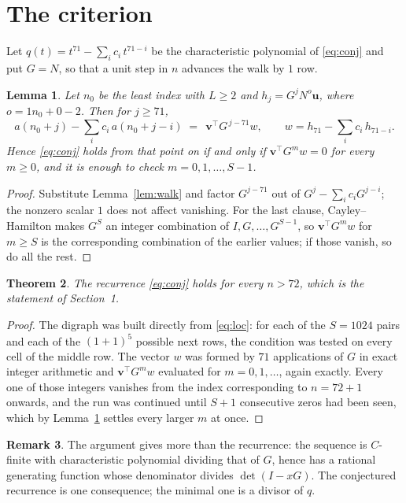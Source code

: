 \documentclass[11pt,a4paper]{article}
\theoremstyle{plain}
\newtheorem{theorem}{Theorem}
\newtheorem{lemma}[theorem]{Lemma}
\theoremstyle{definition}
\newtheorem{remark}[theorem]{Remark}
\begin{document}
\section{The criterion}

Let $q(t)=t^{71}-\sum_i c_i\,t^{71-i}$ be the characteristic polynomial of
\eqref{eq:conj} and put $G=N$, so that a unit step in $n$ advances the walk by
$1$ row.

\begin{lemma}\label{lem:crit}
Let $n_0$ be the least index with $L\ge2$ and $h_j=G^{j}N^{o}\mathbf{u}$, where
$o=1n_0+0-2$. Then for $j\ge71$,
\[
a(n_0+j)-\sum_i c_i\,a(n_0+j-i)\;=\;\,\mathbf{v}^{\!\top}G^{\,j-71}w,
\qquad w=h_{71}-\sum_i c_i\,h_{71-i} .
\]
Hence \eqref{eq:conj} holds from that point on if and only if
$\mathbf{v}^{\!\top}G^{m}w=0$ for every $m\ge0$, and it is enough to check
$m=0,1,\dots,S-1$.
\end{lemma}

\begin{proof}
Substitute Lemma~\ref{lem:walk} and factor $G^{j-71}$ out of
$G^{j}-\sum_ic_iG^{j-i}$; the nonzero scalar $1$ does not affect
vanishing. For the last clause, Cayley--Hamilton makes $G^{S}$ an integer combination of
$I,G,\dots,G^{S-1}$, so $\mathbf{v}^{\!\top}G^{m}w$ for $m\ge S$ is the corresponding
combination of the earlier values; if those vanish, so do all the rest.
\end{proof}

\begin{theorem}
The recurrence \eqref{eq:conj} holds for every $n>72$, which is the statement of
Section~1.
\end{theorem}

\begin{proof}
The digraph was built directly from \eqref{eq:loc}: for each of the $S=1024$ pairs and each
of the $(1+1)^{5}$ possible next rows, the condition was tested on every cell of
the middle row. The vector $w$ was formed by $71$ applications of $G$ in exact integer
arithmetic and $\mathbf{v}^{\!\top}G^{m}w$ evaluated for $m=0,1,\dots$, again exactly.
Every one of those integers vanishes from the index corresponding to $n=72+1$ onwards,
and the run was continued until $S+1$ consecutive zeros had been seen, which by
Lemma~\ref{lem:crit} settles every larger $m$ at once.
\end{proof}

\begin{remark}
The argument gives more than the recurrence: the sequence is $C$-finite with characteristic
polynomial dividing that of $G$, hence has a rational generating function whose denominator
divides $\det(I-xG)$. The conjectured recurrence is one consequence; the minimal one is a
divisor of $q$.
\end{remark}
\end{document}
